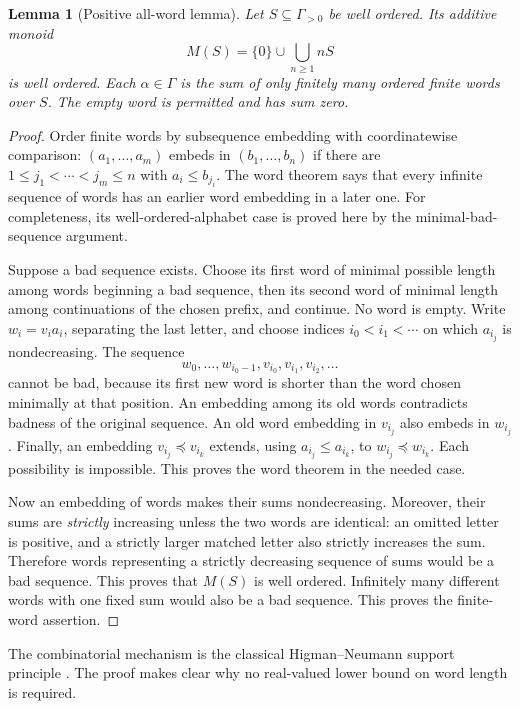 \documentclass[11pt,a4paper]{article}
\newtheorem{lemma}[theorem]{Lemma}
\theoremstyle{definition}
\theoremstyle{remark}
\begin{document}
\begin{lemma}[Positive all-word lemma]\label{lem:words}
Let $S\subseteq\Gamma_{>0}$ be well ordered. Its additive monoid
\[
 M(S)=\{0\}\cup\bigcup_{n\ge1}nS
\]
is well ordered. Each $\alpha\in\Gamma$ is the sum of only finitely many
ordered finite words over $S$. The empty word is permitted and has sum zero.
\end{lemma}
\begin{proof}
Order finite words by subsequence embedding with coordinatewise comparison:
$(a_1,\ldots,a_m)$ embeds in $(b_1,\ldots,b_n)$ if there are
$1\le j_1<\cdots<j_m\le n$ with $a_i\le b_{j_i}$.
The word theorem says that every infinite sequence of words has an earlier
word embedding in a later one. For completeness, its well-ordered-alphabet
case is proved here by the minimal-bad-sequence argument.

Suppose a bad sequence exists. Choose its first word of minimal possible
length among words beginning a bad sequence, then its second word of
minimal length among continuations of the chosen prefix, and continue.
No word is empty. Write $w_i=v_i a_i$, separating the last letter, and
choose indices $i_0<i_1<\cdots$ on which $a_{i_j}$ is nondecreasing.
The sequence
\[
 w_0,\ldots,w_{i_0-1},v_{i_0},v_{i_1},v_{i_2},\ldots
\]
cannot be bad, because its first new word is shorter than the word chosen
minimally at that position. An embedding among its old words contradicts
badness of the original sequence. An old word embedding in $v_{i_j}$ also
embeds in $w_{i_j}$. Finally, an embedding $v_{i_j}\preceq v_{i_k}$ extends,
using $a_{i_j}\le a_{i_k}$, to $w_{i_j}\preceq w_{i_k}$. Each possibility
is impossible. This proves the word theorem in the needed case.

Now an embedding of words makes their sums nondecreasing. Moreover, their
sums are \emph{strictly} increasing unless the two words are identical:
an omitted letter is positive, and a strictly larger matched letter also
strictly increases the sum. Therefore words representing a strictly
decreasing sequence of sums would be a bad sequence. This proves that
$M(S)$ is well ordered. Infinitely many different words with one fixed sum
would also be a bad sequence. This proves the finite-word assertion.
\end{proof}

The combinatorial mechanism is the classical Higman--Neumann support
principle \cite{Higman}. The proof makes clear why no real-valued lower bound
on word length is required.
\end{document}
